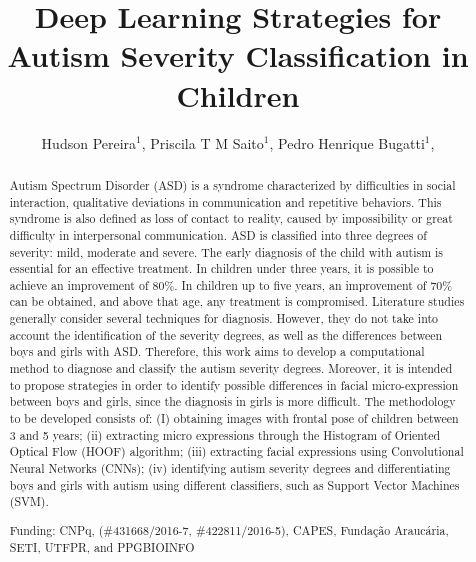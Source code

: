 \documentclass[twoside]{article}
\title{\vspace{-15mm}\fontsize{24pt}{10pt}\selectfont\textbf{ Deep Learning Strategies for Autism Severity Classification in Children }} %
\author{ Hudson Pereira$^{1}$, Priscila T M Saito$^{1}$, Pedro Henrique Bugatti$^{1}$, }
\affil{ 1 Federal University of Technology

 }
\date{}
\begin{document}
  
  
  \maketitle %
  
  
  \thispagestyle{fancy} %
  
  
  \begin{abstract}
  Autism Spectrum Disorder (ASD) is a syndrome characterized by difficulties in social interaction, qualitative deviations in communication and repetitive behaviors. This syndrome is also defined as loss of contact to reality, caused by impossibility or great difficulty in interpersonal communication. ASD is classified into three degrees of severity: mild, moderate and severe. The early diagnosis of the child with autism is essential for an effective treatment. In children under three years, it is possible to achieve an improvement of 80\%. In children up to five years, an improvement of 70\% can be obtained, and above that age, any treatment is compromised. Literature studies generally consider several techniques for diagnosis. However, they do not take into account the identification of the severity degrees, as well as the differences between boys and girls with ASD. Therefore, this work aims to develop a computational method to diagnose and classify the autism severity degrees. Moreover, it is intended to propose strategies in order to identify possible differences in facial micro-expression between boys and girls, since the diagnosis in girls is more difficult. The methodology to be developed consists of: (I) obtaining images with frontal pose of children between 3 and 5 years; (ii) extracting micro expressions through the Histogram of Oriented Optical Flow (HOOF) algorithm; (iii) extracting facial expressions using Convolutional Neural Networks (CNNs); (iv) identifying autism severity degrees and differentiating boys and girls with autism using different classifiers, such as Support Vector Machines (SVM).
  
  Funding: CNPq,  (\#431668/2016-7, \#422811/2016-5), CAPES, Funda\c{c}\~ao Arauc\'aria, SETI, UTFPR, and PPGBIOINFO \\ 
  \end{abstract}
  
\end{document}

